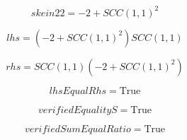 \documentclass[letterpaper, 10pt]{extarticle}
\begin{document}
\begin{dmath*}
skein22 =
    -2 + SCC(1, 1)^{2}
\end{dmath*}


\begin{dmath*}
lhs =
    \left(-2 + SCC(1, 1)^{2}\right) SCC(1, 1)
\end{dmath*}


\begin{dmath*}
rhs =
    SCC(1, 1) \left(-2 + SCC(1, 1)^{2}\right)
\end{dmath*}


\begin{dmath*}
lhsEqualRhs =
    \mathrm{True}
\end{dmath*}


\begin{dmath*}
verifiedEqualityS =
    \mathrm{True}
\end{dmath*}


\begin{dmath*}
verifiedSumEqualRatio =
    \mathrm{True}
\end{dmath*}
\end{document}
